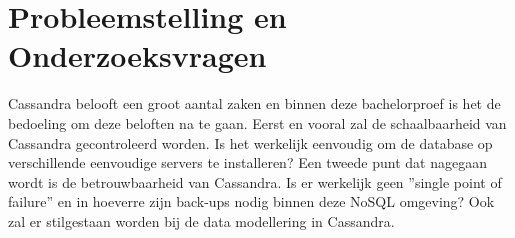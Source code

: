 \section{Probleemstelling en Onderzoeksvragen}
\label{sec:onderzoeksvragen}


Cassandra belooft een groot aantal zaken en binnen deze bachelorproef is het de bedoeling om deze beloften na te gaan.
Eerst en vooral zal de schaalbaarheid van Cassandra gecontroleerd worden.
Is het werkelijk eenvoudig om de database op verschillende eenvoudige servers te installeren?
Een tweede punt dat nagegaan wordt is de betrouwbaarheid van Cassandra.
Is er werkelijk geen ''single point of failure'' en in hoeverre zijn back-ups nodig binnen deze NoSQL omgeving?
Ook zal er stilgestaan worden bij de data modellering in Cassandra.